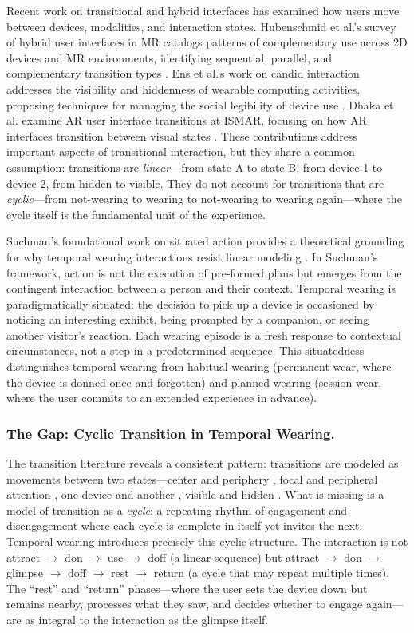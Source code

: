 Recent work on transitional and hybrid interfaces has examined how users move between devices, modalities, and interaction states. Hubenschmid et al.'s survey of hybrid user interfaces in MR catalogs patterns of complementary use across 2D devices and MR environments, identifying sequential, parallel, and complementary transition types \cite{hubenschmid2025hybrid}. Ens et al.'s work on candid interaction addresses the visibility and hiddenness of wearable computing activities, proposing techniques for managing the social legibility of device use \cite{ens2015candid}. Dhaka et al. examine AR user interface transitions at ISMAR, focusing on how AR interfaces transition between visual states \cite{dhaka2024transitions}. These contributions address important aspects of transitional interaction, but they share a common assumption: transitions are \textit{linear}---from state A to state B, from device 1 to device 2, from hidden to visible. They do not account for transitions that are \textit{cyclic}---from not-wearing to wearing to not-wearing to wearing again---where the cycle itself is the fundamental unit of the experience.

Suchman's foundational work on situated action provides a theoretical grounding for why temporal wearing interactions resist linear modeling \cite{suchman2007human}. In Suchman's framework, action is not the execution of pre-formed plans but emerges from the contingent interaction between a person and their context. Temporal wearing is paradigmatically situated: the decision to pick up a device is occasioned by noticing an interesting exhibit, being prompted by a companion, or seeing another visitor's reaction. Each wearing episode is a fresh response to contextual circumstances, not a step in a predetermined sequence. This situatedness distinguishes temporal wearing from habitual wearing (permanent wear, where the device is donned once and forgotten) and planned wearing (session wear, where the user commits to an extended experience in advance).

\subsubsection{The Gap: Cyclic Transition in Temporal Wearing.}
The transition literature reveals a consistent pattern: transitions are modeled as movements between two states---center and periphery \cite{weiser1996calm}, focal and peripheral attention \cite{bakker2015peripheral}, one device and another \cite{hubenschmid2025hybrid}, visible and hidden \cite{ens2015candid}. What is missing is a model of transition as a \textit{cycle}: a repeating rhythm of engagement and disengagement where each cycle is complete in itself yet invites the next. Temporal wearing introduces precisely this cyclic structure. The interaction is not attract $\rightarrow$ don $\rightarrow$ use $\rightarrow$ doff (a linear sequence) but attract $\rightarrow$ don $\rightarrow$ glimpse $\rightarrow$ doff $\rightarrow$ rest $\rightarrow$ return (a cycle that may repeat multiple times). The ``rest'' and ``return'' phases---where the user sets the device down but remains nearby, processes what they saw, and decides whether to engage again---are as integral to the interaction as the glimpse itself.


